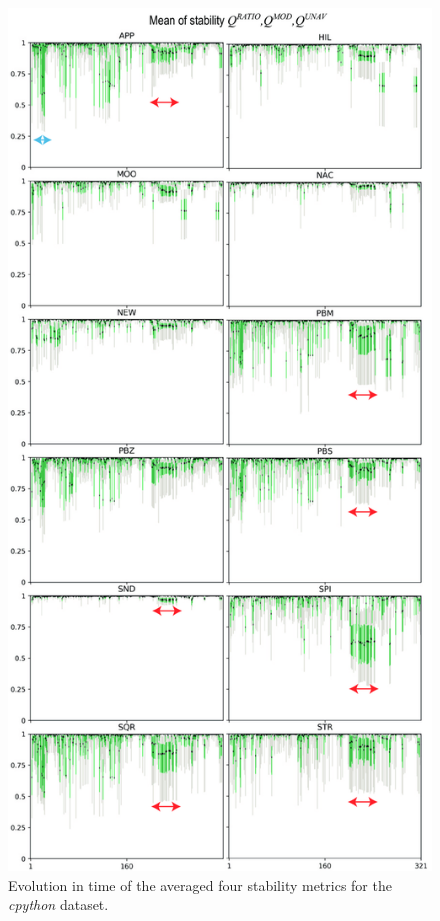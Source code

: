 \begin{figure}[htbp!]
\centering
\includegraphics[width=.8\textwidth]{figures/initial-treemap-evaluation/boxplot-b.png}
\vspace{-0.25cm}
\caption{Evolution in time of the averaged four stability metrics for the \emph{cpython} dataset.}
\label{fig:boxplots_1b}
\end{figure}

